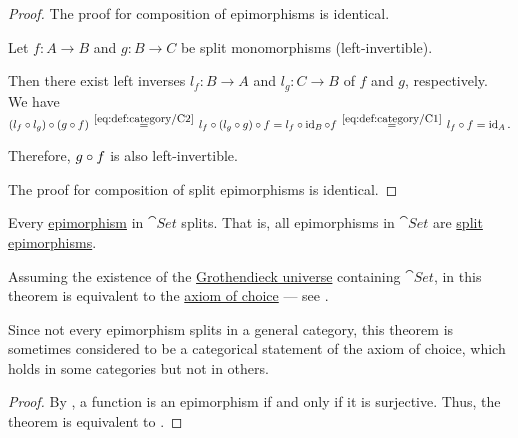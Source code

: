 \begin{proof}
  The proof for composition of epimorphisms is identical.

   Let \( f: A \to B \) and \( g: B \to C \) be split monomorphisms (left-invertible).

  Then there exist left inverses \( l_f: B \to A \) and \( l_g: C \to B \) of \( f \) and \( g \), respectively. We have
  \begin{equation*}
    (l_f \bincirc l_g) \bincirc (g \bincirc f)
    \reloset {\eqref{eq:def:category/C2}} =
    l_f \bincirc (l_g \bincirc g) \bincirc f
    =
    l_f \bincirc \id_B \bincirc f
    \reloset {\eqref{eq:def:category/C1}} =
    l_f \bincirc f
    =
    \id_A.
  \end{equation*}

  Therefore, \( g \bincirc f \) is also left-invertible.

  The proof for composition of split epimorphisms is identical.
\end{proof}

\begin{theorem}\label{thm:epimorphisms_split_in_set}
  Every \hyperref[def:morphism_invertibility/right_cancellative]{epimorphism} in \hyperref[def:category_of_small_sets]{\( \cat{Set} \)} splits. That is, all epimorphisms in \( \cat{Set} \) are \hyperref[def:morphism_invertibility/right_invertible]{split epimorphisms}.

  Assuming the existence of the \hyperref[def:grothendieck_universe]{Grothendieck universe} containing \( \cat{Set} \), in \hyperref[def:zfc]{} this theorem is equivalent to the \hyperref[def:zfc/choice]{axiom of choice} --- see .

  Since not every epimorphism splits in a general category, this theorem is sometimes considered to be a categorical statement of the axiom of choice, which holds in some categories but not in others.
\end{theorem}
\begin{proof}
  By , a function is an epimorphism if and only if it is surjective. Thus, the theorem is equivalent to .
\end{proof}

